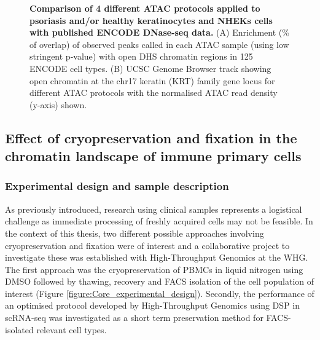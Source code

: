 \begin{figure}[H]
\begin{subfigure}{0.65\textwidth}
\caption{\textbf{}}
\end{subfigure}
\caption[Comparison of 4 different ATAC protocols applied to psoriasis and/or healthy keratinocytes and NHEKs cells with published ENCODE DNase-seq data.]{\textbf{Comparison of 4 different ATAC protocols applied to psoriasis and/or healthy keratinocytes and NHEKs cells with published ENCODE DNase-seq data.} (A) Enrichment (\% of overlap) of observed peaks called in each ATAC sample (using low stringent p-value) with open DHS chromatin regions in 125 ENCODE cell types. (B) UCSC Genome Browser track showing open chromatin at the chr17 keratin (KRT) family gene locus for different ATAC protocols with the normalised ATAC read density (y-axis) shown.}
\label{figure:ATAC_skin_ENCODE_overlap_and_tracks}
\end{figure} 
\smallskip

	
\subsection{Effect of cryopreservation and fixation in the chromatin landscape of immune primary cells}
\label{Core}
\subsubsection{Experimental design and sample description}
As previously introduced, research using clinical samples represents a logistical challenge as immediate processing of freshly acquired cells may not be feasible. In the context of this thesis, two different possible approaches involving cryopreservation and fixation were of interest and a collaborative project to investigate these was established with High-Throughput Genomics at the WHG. The first approach was the cryopreservation of PBMCs in liquid nitrogen using DMSO followed by thawing, recovery and FACS isolation of the cell population of interest (Figure \ref{figure:Core_experimental_design}). Secondly, the performance of an optimised protocol developed by High-Throughput Genomics using DSP in scRNA-seq \parencite{Attar2018} was investigated as a short term preservation method for FACS-isolated relevant cell types.


